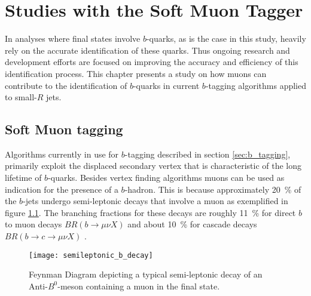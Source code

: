 \chapter{Studies with the Soft Muon Tagger}
In analyses where final states involve  $b$-quarks, as is the case in this study, heavily rely on the accurate identification of these quarks. Thus ongoing research and development efforts are focused on improving the accuracy and efficiency of this identification process. This chapter presents a study on how muons can contribute to the identification of $b$-quarks in current $b$-tagging algorithms applied to small-$R$ jets.

\section{Soft Muon tagging}
\label{sec:SoftMuonTagging}
Algorithms currently in use for $b$-tagging described in section \ref{sec:b_tagging}, primarily exploit the displaced secondary vertex that is characteristic of the long lifetime of $b$-quarks. Besides vertex finding algorithms muons can be used as indication for the presence of a $b$-hadron. This is because approximately \qty{20}{\percent} of the $b$-jets undergo semi-leptonic decays that involve a muon as exemplified in figure \ref{fig:semileptonicDecay}. The branching fractions for these decays are roughly \qty{11}{\percent} for direct $b$ to muon decays $BR( b \rightarrow \mu \nu X )$ and about \qty{10}{\percent} for cascade decays $BR( b \rightarrow c \rightarrow \mu \nu X )$ \citep{expectedPerformanceAtlas}.
\begin{figure}[]
  \centering
  \texttt{[image: semileptonic\_b\_decay]}
  \caption{Feynman Diagram depicting a typical semi-leptonic decay of an Anti-$B^0$-meson containing a muon in the final state.}
  \label{fig:semileptonicDecay}
\end{figure}

